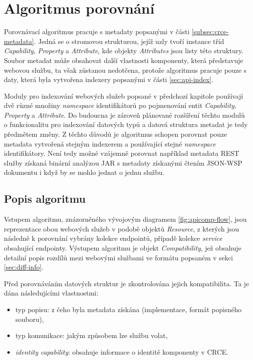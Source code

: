\documentclass[czech,DP]{thesiskiv}
\begin{document}
\section{Algoritmus porovnání}
\label{sec:cmp-alg}

Porovnávací algoritmus pracuje s metadaty popsanými v části \ref{subsec:crce-metadata}. Jedná se o stromovou strukturou, jejíž uzly tvoří instance tříd \textit{Capability}, \textit{Property} a \textit{Attribute}, kde objekty \textit{Attributes} jsou listy této struktury. Soubor metadat může obsahovat další vlastnosti komponenty, která představuje webovou službu, ta však zůstanou nedotčena, protože algoritmus pracuje pouze s daty, která byla vytvořena indexery popsanými v části \ref{sec:api-index}.

Moduly pro indexování webových služeb popsané v předchozí kapitole používají dvě různé množiny \textit{namespace} identifikátorů po pojmenování entit \textit{Capability}, \textit{Property} a \textit{Attribute}. Do budoucna je zároveň plánované rozšíření těchto modulů o funkcionalitu pro indexování datových typů a datová struktura metadat je tedy předmětem změny. Z těchto důvodů je algoritmus schopen porovnat pouze metadata vytvořená stejným indexerem a používající stejné \textit{namespace} identifikátory. Není tedy možné vzájemně porovnat například metadata REST služby získaná binární analýzou JAR s metadaty získanými čtením JSON-WSP dokumentu i když by se mohlo jednat o jednu službu.

\subsection{Popis algoritmu}
\label{sec:alg-desc}

Vstupem algoritmu, znázorněného vývojovým diagramem \ref{fig:apicomp-flow}, jsou reprezentace obou webových služeb v podobě objektů \textit{Resource}, z kterých jsou následně k porovnání vybrány kolekce endpointů, případě kolekce \textit{service} obsahující endpointy. Výstupem algoritmu je objekt \textit{Compatibility}, jež obsahuje detailní popis rozdílů mezi webovými službami ve formátu popsaném v sekci \ref{sec:diff-info}.

Před porovnáváním datových struktur je zkontrolována jejich kompatibilita. Ta je dána následujícími vlastnostmi:

\begin{itemize}
	\item typ popisu: z čeho byla metadata získána (implementace, formát popisného souboru),
	\item typ komunikace: jakým způsobem lze službu volat,
	\item \textit{identity capability}: obsahuje informace o identitě komponenty v CRCE.
\end{itemize}
\end{document}
